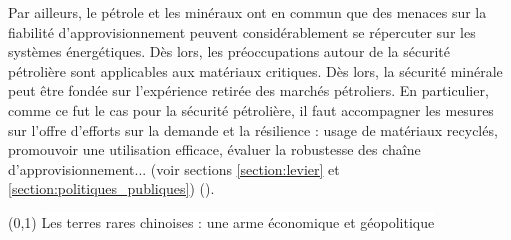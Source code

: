 \smallbreak
Par ailleurs, le pétrole et les minéraux ont en commun que des menaces sur la fiabilité d'approvisionnement peuvent considérablement se répercuter sur les systèmes énergétiques. Dès lors, les préoccupations autour de la sécurité pétrolière sont applicables aux matériaux critiques. Dès lors, la sécurité minérale peut être fondée sur l'expérience retirée des marchés pétroliers. En particulier, comme ce fut le cas pour la sécurité pétrolière, il faut accompagner les mesures sur l'offre d'efforts sur la demande et la résilience : usage de matériaux recyclés, promouvoir une utilisation efficace, évaluer la robustesse des chaîne d'approvisionnement... (voir sections \ref{section:levier} et \ref{section:politiques_publiques}) (\cite{iea_role_2021}).
\bigbreak

\begin{center}
    \boxput*(0,1){
        \colorbox{white}{Les terres rares chinoises : une arme économique et géopolitique}
    }{
    \setlength{\fboxsep}{15pt}
    \fbox{\begin{minipage}{14cm} 


\end{minipage}}}
\end{center}
